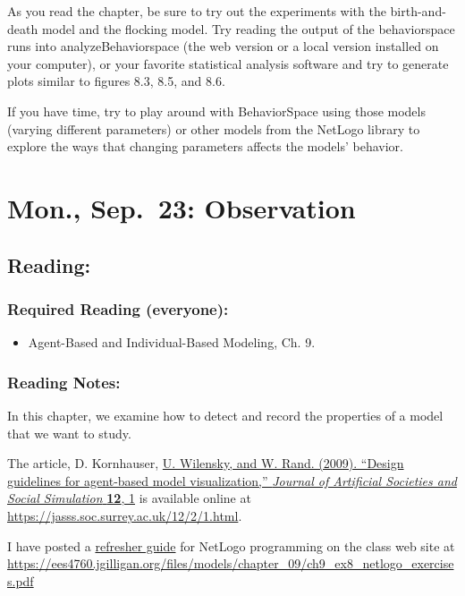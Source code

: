 \documentclass[
]{article}
\providecommand{\tightlist}{%
  \setlength{\itemsep}{0pt}\setlength{\parskip}{0pt}}
\begin{document}
As you read the chapter, be sure to try out the experiments with the
birth-and-death model and the flocking model. Try reading the output of
the behaviorspace runs into analyzeBehaviorspace (the web version or a
local version installed on your computer), or your favorite statistical
analysis software and try to generate plots similar to figures 8.3, 8.5,
and 8.6.

If you have time, try to play around with BehaviorSpace using those
models (varying different parameters) or other models from the NetLogo
library to explore the ways that changing parameters affects the models'
behavior.

\section{Mon., Sep.~23: Observation}\label{mon.-sep.-23-observation}

\subsection{Reading:}\label{reading-9}

\subsubsection{Required Reading
(everyone):}\label{required-reading-everyone-8}

\begin{itemize}
\tightlist
\item
  Agent-Based and Individual-Based Modeling, Ch. 9.
\end{itemize}

\subsubsection{Reading Notes:}\label{reading-notes-8}

In this chapter, we examine how to detect and record the properties of a
model that we want to study.

The article, D. Kornhauser,
\href{https://jasss.soc.surrey.ac.uk/12/2/1.html}{U. Wilensky, and W.
Rand. (2009). ``Design guidelines for agent-based model visualization,''
\emph{Journal of Artificial Societies and Social Simulation}
\textbf{12}, 1} is available online at
\url{https://jasss.soc.surrey.ac.uk/12/2/1.html}.

I have posted a
\href{/files/models/chapter_09/ch9_ex8_netlogo_exercises.pdf}{refresher
guide} for NetLogo programming on the class web site at
\url{https://ees4760.jgilligan.org/files/models/chapter_09/ch9_ex8_netlogo_exercises.pdf}
\end{document}
